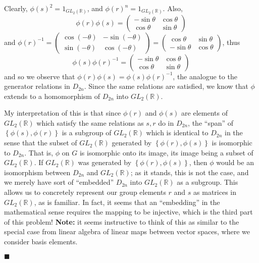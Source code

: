 \documentclass[12pt]{article}
\renewcommand{\qed}{\hfill$\blacksquare$}
\renewenvironment{proof}{\begin{addmargin}[1em]{0em}\begin{newproof}}{\end{newproof}\end{addmargin}\qed}
\begin{document}
\begin{proof}
\begin{itemize}
    Clearly, $\phi\left(s\right)^2 = 1_{GL_2\left(\mathbb{R}\right)}$, and $\phi\left(r\right)^n = 1_{GL_2\left(\mathbb{R}\right)}$. Also,
    $$ \phi\left(r\right)\phi\left(s\right) = \left(\begin{array}{cc} -\sin\theta & \cos \theta \\ \cos\theta & \sin\theta \end{array}\right) $$
    and $\phi\left(r\right)^{-1} = \left(\begin{array}{cc} \cos \left(-\theta\right) & - \sin\left( -\theta\right) \\ \sin\left( -\theta\right) & \cos\left( -\theta\right) \end{array}\right) = \left( \begin{array}{cc} \cos\theta & \sin \theta \\ -\sin\theta & \cos \theta \end{array}\right)$, thus
    $$ \phi\left(s\right)\phi\left(r\right)^{-1} = \left(\begin{array}{cc} -\sin \theta & \cos \theta \\ \cos \theta & \sin \theta \end{array}\right) $$ and so we observe that $\phi\left(r\right)\phi\left(s\right)=\phi\left(s\right)\phi\left(r\right)^{-1}$, the analogue to the generator relations in $D_{2n}$. Since the same relations are satisfied, we know that $\phi$ extends to a homomorphism of $D_{2n}$ into $GL_2\left(\mathbb{R}\right)$.

    My interpretation of this is that since $\phi\left(r\right)$ and $\phi\left(s\right)$ are elements of $GL_2\left(\mathbb{R}\right)$ which satisfy the same relations as $s,r$ do in $D_{2n}$, the ``span'' of $\left\{ \phi\left(s\right),\phi\left(r\right)\right\}$ is a subgroup of $GL_2\left(\mathbb{R}\right)$ which is identical to $D_{2n}$ in the sense that the subset of $GL_2\left(\mathbb{R}\right)$ generated by $\left\{ \phi\left(r\right),\phi\left(s\right)\right\}$ is isomorphic to $D_{2n}$. That is, $\phi$ on $G$ is isomorphic onto its image, its image being a subset of $GL_2\left(\mathbb{R}\right)$. If $GL_2\left(\mathbb{R}\right)$ was generated by $\left\{\phi\left(r\right),\phi\left(s\right)\right\}$, then $\phi$ would be an isomorphism between $D_{2n}$ and $GL_2\left(\mathbb{R}\right)$; as it stands, this is not the case, and we merely have sort of ``embedded'' $D_{2n}$ into $GL_2\left(\mathbb{R}\right)$ as a subgroup. This allows us to concretely represent our group elements $r$ and $s$ as matrices in $GL_2\left(\mathbb{R}\right)$, as is familiar. In fact, it seems that an ``embedding'' in the mathematical sense requires the mapping to be injective, which is the third part of this problem! \textbf{Note:} it seems instructive to think of this as similar to the special case from linear algebra of linear maps between vector spaces, where we consider basis elements.


\end{itemize}
\end{proof}
\end{document}
